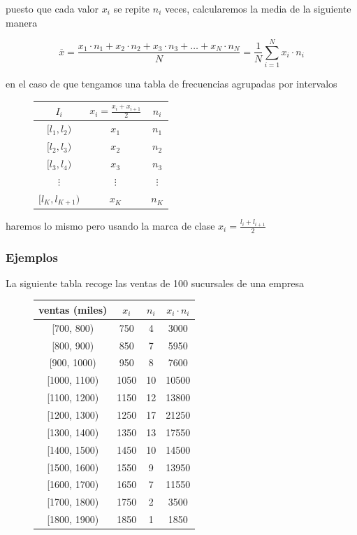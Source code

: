 \documentclass[]{article}
\theoremstyle{plain}
\theoremstyle{definition}
\theoremstyle{definition} %
\begin{document}
puesto que cada valor \(x_i\) se repite \(n_i\) veces, calcularemos la
media de la siguiente manera

\[\overline x = \frac{x_1 \cdot n_1 + x_2  \cdot n_2 + x_3  \cdot n_3 +\ldots  + x_N  \cdot n_N}{N} = \frac{1}{N}\sum^{N}_{i=1} x_i  \cdot n_i\]

en el caso de que tengamos una tabla de frecuencias agrupadas por
intervalos


\begin{figure}
  \centering
\begin{tabular}{ccc}
  \(I_i\) & \(x_i = \frac{x_i + x_{i+1}}{2}\) & \(n_i\)\\
  \hline
  \([l_1, l_2)\) & \(x_1\) & \(n_1\)      \\
  \([l_2, l_3)\) & \(x_2\) & \(n_2\)      \\
  \([l_3, l_4)\) & \(x_3\) & \(n_3\)      \\
  \(\vdots\) & \(\vdots\) & \(\vdots\)    \\
  \([l_{K}, l_{K+1})\) & \(x_K\) & \(n_K\)\\
\end{tabular}
\end{figure}

haremos lo mismo pero usando la marca de clase
\(x_i = \frac{l_i + l_{i+1}}{2}\)

\hypertarget{ejemplos}{%
\subsubsection{Ejemplos}\label{ejemplos}}

La siguiente tabla recoge las ventas de 100 sucursales de una empresa

\begin{figure}
  \centering
\begin{tabular}{cccc}
ventas (miles) & \(x_i\) & \(n_i\) & \(x_i \cdot n_i\)\\
\hline
{[}700, 800)   & 750  & 4  & 3000  \\
{[}800, 900)   & 850  & 7  & 5950  \\
{[}900, 1000)  & 950  & 8  & 7600  \\
{[}1000, 1100) & 1050 & 10 & 10500 \\
{[}1100, 1200) & 1150 & 12 & 13800 \\
{[}1200, 1300) & 1250 & 17 & 21250 \\
{[}1300, 1400) & 1350 & 13 & 17550 \\
{[}1400, 1500) & 1450 & 10 & 14500 \\
{[}1500, 1600) & 1550 & 9  & 13950 \\
{[}1600, 1700) & 1650 & 7  & 11550 \\
{[}1700, 1800) & 1750 & 2  & 3500  \\
{[}1800, 1900) & 1850 & 1  & 1850  \\
\end{tabular}
\end{figure}
\end{document}
